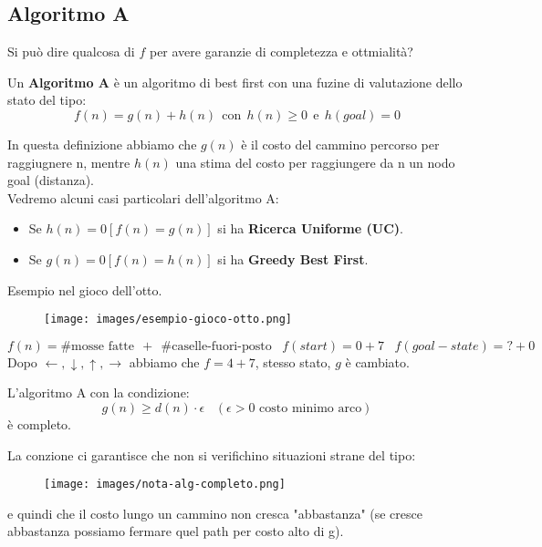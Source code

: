 \subsection{Algoritmo A}
Si può dire qualcosa di $f$ per avere garanzie di completezza e ottmialità?
\begin{definition}
    Un \textbf{Algoritmo A} è un algoritmo di best first con una fuzine di valutazione dello stato del tipo:
    $$f(n) = g(n) + h(n) \:\: \text{con}\:\: h(n) \geq 0 \:\: \text{e}\:\: h(goal) = 0$$
\end{definition}
In questa definizione abbiamo che $g(n)$ è il costo del cammino percorso per raggiugnere n, mentre $h(n)$ una
stima del costo per raggiungere da n un nodo goal (distanza).\\
Vedremo alcuni casi particolari dell'algoritmo A:
\begin{itemize}
    \item Se $h(n) = 0 [f(n) = g(n)]$ si ha \textbf{Ricerca Uniforme (UC)}.
    \item Se $g(n) = 0 [f(n) = h(n)]$ si ha \textbf{Greedy Best First}.
\end{itemize}
\begin{example}
    Esempio nel gioco dell'otto.
    \begin{figure}[h!]
        \centering
        \texttt{[image: images/esempio-gioco-otto.png]}
    \end{figure}

    \hspace{-15pt}$f(n) = \#\text{mosse fatte} \:\: + \:\: \#\text{caselle-fuori-posto} \hspace{10pt} f(start) = 0 + 7 \hspace{10pt} f(goal-state) = ? + 0$\\
    Dopo $\leftarrow, \downarrow, \uparrow, \rightarrow$ abbiamo che $f = 4 + 7$, stesso stato, $g$ è cambiato.
\end{example}
\begin{theorem}
    L'algoritmo A con la condizione:
    $$g(n) \geq d(n) \cdot \epsilon \hspace{10pt}(\epsilon >0 \text{ costo minimo arco})$$
    è completo.
\end{theorem}
\begin{note}
    La conzione ci garantisce che non si verifichino situazioni strane del tipo:
    \begin{figure}[h!]
        \centering
        \texttt{[image: images/nota-alg-completo.png]}
    \end{figure}
    e quindi che il costo lungo un cammino non cresca "abbastanza" (se cresce abbastanza possiamo fermare quel path per costo alto di g).
\end{note}

